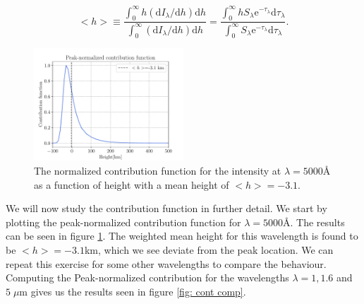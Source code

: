 \documentclass[a4paper,11.5pt,]{article}
\begin{document}
\begin{multicols}{2}
\begin{equation}
    < h > \equiv \frac { \int _ { 0 } ^ { \infty } h \left( \mathrm { d } I _ { \lambda } / \mathrm { d } h \right) \mathrm { d } h } { \int _ { 0 } ^ { \infty } \left( \mathrm { d } I _ { \lambda } / \mathrm { d } h \right) \mathrm { d } h } = \frac { \int _ { 0 } ^ { \infty } h S _ { \lambda } \mathrm { e } ^ { - \tau _ { \lambda } } \mathrm { d } \tau _ { \lambda } } { \int _ { 0 } ^ { \infty } S _ { \lambda } \mathrm { e } ^ { - \tau _ { \lambda } } \mathrm { d } \tau _ { \lambda } }.
\end{equation}

\begin{figure}[H]
    \centering
    \includegraphics[width = 0.5\textwidth]{figures/2.4/contfunc_single.pdf}
    \caption{The normalized contribution function for the intensity at $\lambda = 5000$Å as a function of height with a mean height of $< h > = -3.1$.}
    \label{fig: peaknorm single}
\end{figure}

We will now study the contribution function in further detail. We start by plotting the peak-normalized contribution function for $\lambda = 5000$Å. The results can be seen in figure \ref{fig: peaknorm single}. The weighted mean height for this wavelength is found to be $< h > = -3.1 $km, which we see deviate from the peak location. We can repeat this exercise for some other wavelengths to compare the behaviour. Computing the Peak-normalized contribution for the wavelengths $\lambda = 1, 1.6$ and $5\;\mu$m gives us the results seen in figure \ref{fig: cont comp}.

\end{multicols}
\end{document}
